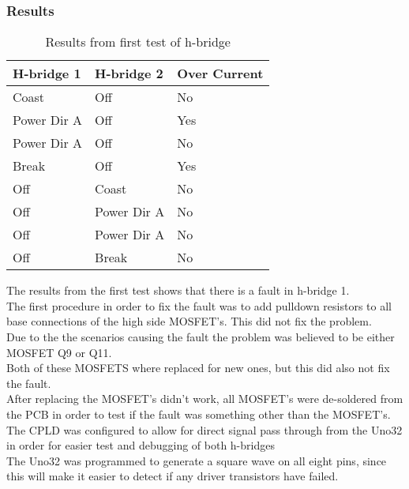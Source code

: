 \subsubsection{Results}
\begin{table}[h]
\centering
\begin{tabular}{l|l|l}
\textbf{H-bridge 1} & \textbf{H-bridge 2} & \textbf{Over Current} \\ \hline
\rowcolor[HTML]{EFEFEF} 
Coast               & Off                 & No                    \\ \hline
Power Dir A         & Off                 & Yes                   \\ \hline
\rowcolor[HTML]{EFEFEF} 
Power Dir A         & Off                 & No                    \\ \hline
Break               & Off                 & Yes                   \\ \hline
\rowcolor[HTML]{EFEFEF} 
Off                 & Coast               & No                    \\ \hline
Off                 & Power Dir A         & No                    \\ \hline
\rowcolor[HTML]{EFEFEF} 
Off                 & Power Dir A         & No                    \\ \hline
Off                 & Break               & No                   
\end{tabular}
\caption{Results from first test of h-bridge}
\label{firsthbridgetest}
\end{table} 
The results from the first test shows that there is a fault in h-bridge 1.\\ 
The first procedure in order to fix the fault was to add pulldown resistors to all base connections of the high side MOSFET's. This did not fix the problem.\\
Due to the the scenarios causing the fault the problem was believed to be either MOSFET Q9 or Q11.\\
Both of these MOSFETS where replaced for new ones, but this did also not fix the fault.\\
After replacing the MOSFET's didn't work, all MOSFET's were de-soldered from the PCB in order to test if the fault was something other than the MOSFET's.\\
The CPLD was configured to allow for direct signal pass through from the Uno32 in order for easier test and debugging of both h-bridges\\
The Uno32 was programmed to generate a square wave on all eight pins, since this will make it easier to detect if any driver transistors have failed.
